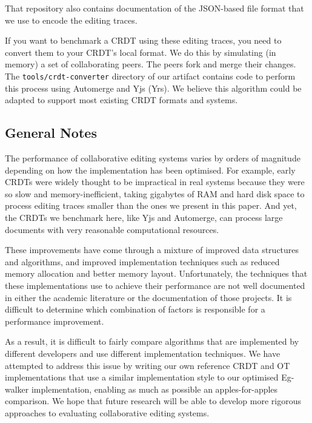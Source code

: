 \documentclass[sigplan,10pt]{acmart}
\begin{document}
That repository also contains documentation of the JSON-based file format that we use to encode the editing traces.

If you want to benchmark a CRDT using these editing traces, you need to convert them to your CRDT's local format. We do this by simulating (in memory) a set of collaborating peers. The peers fork and merge their changes. The \texttt{tools/crdt-converter} directory of our artifact contains code to perform this process using Automerge and Yjs (Yrs). We believe this algorithm could be adapted to support most existing CRDT formats and systems.

\subsection{General Notes}

The performance of collaborative editing systems varies by orders of magnitude depending on how the implementation has been optimised. For example, early CRDTs were widely thought to be impractical in real systems because they were so slow and memory-inefficient, taking gigabytes of RAM and hard disk space to process editing traces smaller than the ones we present in this paper. And yet, the CRDTs we benchmark here, like Yjs and Automerge, can process large documents with very reasonable computational resources.

These improvements have come through a mixture of improved data structures and algorithms, and improved implementation techniques such as reduced memory allocation and better memory layout.
Unfortunately, the techniques that these implementations use to achieve their performance are not well documented in either the academic literature or the documentation of those projects.
It is difficult to determine which combination of factors is responsible for a performance improvement.

As a result, it is difficult to fairly compare algorithms that are implemented by different developers and use different implementation techniques.
We have attempted to address this issue by writing our own reference CRDT and OT implementations that use a similar implementation style to our optimised Eg-walker implementation, enabling as much as possible an apples-for-apples comparison.
We hope that future research will be able to develop more rigorous approaches to evaluating collaborative editing systems.
\end{document}
